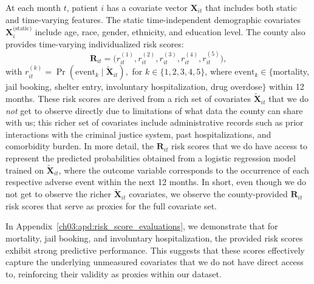 At each month \(t\), patient \(i\) has a covariate vector \(\mathbf{X}_{it}\) that includes both static and time-varying features. 
The static time-independent demographic covariates \( \mathbf{X}_i^{\text{(static)}} \) include age, race, gender, ethnicity, and education level.
The county also provides time-varying individualized risk scores:
\[
\mathbf{R}_{it} = \big(r_{it}^{(1)}, r_{it}^{(2)}, r_{it}^{(3)}, r_{it}^{(4)}, r_{it}^{(5)}\big),
\]
with
\(
r_{it}^{(k)} = \Pr(\text{event}_k \mid \widetilde{\mathbf{X}}_{it}),
\)
for \(k \in \{1,2,3,4,5\}\),
where \(\text{event}_k \in \{\)mortality, jail booking, shelter entry, involuntary hospitalization, drug overdose\(\}\) within 12 months.
These risk scores are derived from a rich set of covariates \(\mathbf{\widetilde{X}}_{it}\) that we do \emph{not} get to observe directly due to limitations of what data the county can share with us; this richer set of covariates include administrative records such as prior interactions with the criminal justice system, past hospitalizations, and comorbidity burden.
In more detail, the $\mathbf{R}_{it}$ risk scores that we do have access to represent the predicted probabilities obtained from a logistic regression model trained on \(\mathbf{\widetilde{X}}_{it}\), where the outcome variable corresponds to the occurrence of each respective adverse event within the next 12 months.
In short, even though we do not get to observe the richer \(\mathbf{\widetilde{X}}_{it}\) covariates, we observe the county-provided $\mathbf{R}_{it}$ risk scores that serve as proxies for the full covariate set.

In Appendix~\ref{ch03:apd:risk_score_evaluations}, we demonstrate that for mortality, jail booking, and involuntary hospitalization, the provided risk scores exhibit strong predictive performance.
This suggests that these scores effectively capture the underlying unmeasured covariates that we do not have direct access to, reinforcing their validity as proxies within our dataset. 

